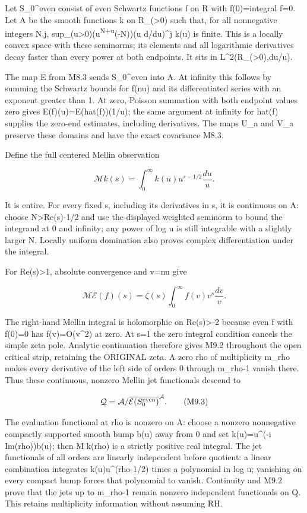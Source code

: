 Let S\_0\^{}even consist of even Schwartz functions f on R with
f(0)=integral f=0. Let A be the smooth functions k on R\_(\textgreater0)
such that, for all nonnegative integers N,j,
sup\_(u\textgreater0)(u\textsuperscript{N+u}(-N))\textbar(u d/du)\^{}j
k(u)\textbar{} is finite. This is a locally convex space with these
seminorms; its elements and all logarithmic derivatives decay faster
than every power at both endpoints. It sits in
L\^{}2(R\_(\textgreater0),du/u).

The map E from M8.3 sends S\_0\^{}even into A. At infinity this follows
by summing the Schwartz bounds for f(nu) and its differentiated series
with an exponent greater than 1. At zero, Poisson summation with both
endpoint values zero gives E(f)(u)=E(hat(f))(1/u); the same argument at
infinity for hat(f) supplies the zero-end estimates, including
derivatives. The maps U\_a and V\_a preserve these domains and have the
exact covariance M8.3.

Define the full centered Mellin observation

\[
\mathcal M k(s)=\int_0^\infty k(u)u^{s-1/2}\frac{du}{u}.
\tag{M9.1}
\]

It is entire. For every fixed s, including its derivatives in s, it is
continuous on A: choose N\textgreater\textbar Re(s)-1/2\textbar{} and
use the displayed weighted seminorm to bound the integrand at 0 and
infinity; any power of \textbar log u\textbar{} is still integrable with
a slightly larger N. Locally uniform domination also proves complex
differentiation under the integral.

For Re(s)\textgreater1, absolute convergence and v=nu give

\[
\mathcal M\mathcal E(f)(s)=\zeta(s)
\int_0^\infty f(v)v^s\frac{dv}{v}.
\tag{M9.2}
\]

The right-hand Mellin integral is holomorphic on Re(s)\textgreater-2
because even f with f(0)=0 has f(v)=O(v\^{}2) at zero. At s=1 the zero
integral condition cancels the simple zeta pole. Analytic continuation
therefore gives M9.2 throughout the open critical strip, retaining the
ORIGINAL zeta. A zero rho of multiplicity m\_rho makes every derivative
of the left side of orders 0 through m\_rho-1 vanish there. Thus these
continuous, nonzero Mellin jet functionals descend to

\[
\mathcal Q=\mathcal A/\overline{\mathcal E(S_0^{\rm even})}^{\mathcal A}.
\tag{M9.3}
\]

The evaluation functional at rho is nonzero on A: choose a nonzero
nonnegative compactly supported smooth bump b(u) away from 0 and set
k(u)=u\^{}(-i Im(rho))b(u); then M k(rho) is a strictly positive real
integral. The jet functionals of all orders are linearly independent
before quotient: a linear combination integrates k(u)u\^{}(rho-1/2)
times a polynomial in log u; vanishing on every compact bump forces that
polynomial to vanish. Continuity and M9.2 prove that the jets up to
m\_rho-1 remain nonzero independent functionals on Q. This retains
multiplicity information without assuming RH.

